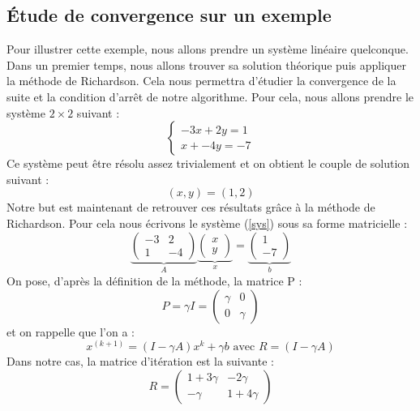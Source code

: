 \subsection{Étude de convergence sur un exemple}
Pour illustrer cette exemple, nous allons prendre un système linéaire quelconque. Dans un premier temps, nous allons trouver sa solution théorique puis appliquer la méthode de Richardson. Cela nous permettra d'étudier la convergence de la suite et la condition d'arrêt de notre algorithme. Pour cela, nous allons prendre le système $2\times 2$ suivant : 
\begin{equation}
\begin{cases}
-3x + 2y = 1\\
x + -4y = -7
\end{cases}
\label{sys}
\end{equation}
Ce système peut être résolu assez trivialement et on obtient le couple de solution suivant : \begin{equation}
(x, y) = (1, 2)
\end{equation}
Notre but est maintenant de retrouver ces résultats grâce à la méthode de Richardson. Pour cela nous écrivons le système (\ref{sys}) sous sa forme matricielle : 
\begin{equation}
\underbrace{\begin{pmatrix}
	-3 & 2 \\
	1 & -4
	\end{pmatrix}}_{A} 
\underbrace{\begin{pmatrix}
	x \\ y
	\end{pmatrix} }_{x} 
=
\underbrace{\begin{pmatrix}
	1 \\ -7
	\end{pmatrix}}_{b}  
\end{equation}
On pose, d'après la définition de la méthode, la matrice P : 
\begin{equation}
P = \gamma I = 
\begin{pmatrix}
\gamma & 0 \\
0 & \gamma
\end{pmatrix}
\end{equation}
et on rappelle que l'on a : 
\begin{equation}
x^{(k+1)} = (I - \gamma A)x^{k} + \gamma b \text{ avec } R = (I - \gamma A)
\end{equation}
Dans notre cas, la matrice d'itération est la suivante : 
\begin{equation}
R = 
\begin{pmatrix}
1 + 3\gamma   & -2\gamma \\
-\gamma & 1+4\gamma
\end{pmatrix}
\end{equation}
